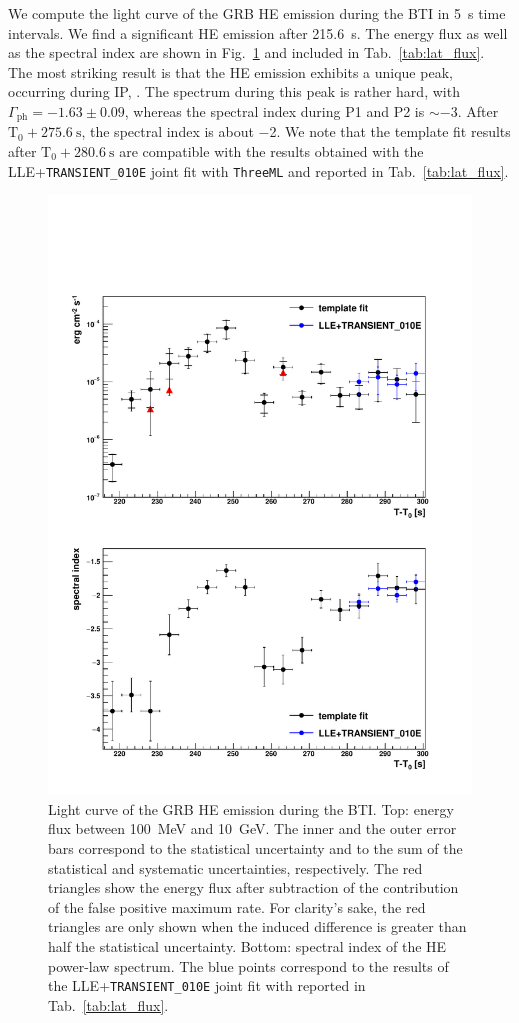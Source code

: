 \documentclass[preprint]{aastex631}
\begin{document}
We compute the light curve of the GRB HE emission during the BTI in 5~s time intervals. We find a significant HE emission after 215.6~s. The energy flux as well as the spectral index are shown in Fig.~\ref{fig:LightCurveBTI} and included in Tab.~\ref{tab:lat_flux}. The most striking result is that the HE emission exhibits a unique peak, occurring during IP, . The spectrum during this peak is rather hard, with $\Gamma_\mathrm{ph} = -1.63 \pm 0.09$, whereas the spectral index during P1 and P2 is $\sim -3$. After $\mathrm{T}_0+275.6~\mathrm{s}$, the spectral index is about $-$2. We note that the template fit results after $\mathrm{T}_0+280.6~\mathrm{s}$ are compatible with the results obtained with the LLE+{\tt TRANSIENT\_010E} joint fit with {\tt ThreeML} and reported in Tab.~\ref{tab:lat_flux}.

\begin{figure}[t]
    \centering
    \includegraphics[width=0.6\linewidth]{paper_showLightCurve_215.pdf}
    \caption{Light curve of the GRB HE emission during the BTI. Top: energy flux between 100~MeV and 10~GeV. The inner and the outer error bars correspond to the statistical uncertainty and to the sum of the statistical and systematic uncertainties, respectively. The red triangles show the energy flux after subtraction of the contribution of the false positive maximum rate. For clarity's sake, the red triangles are only shown when the induced difference is greater than half the statistical uncertainty. Bottom: spectral index of the HE power-law spectrum. The blue points correspond to the results of the LLE+{\tt TRANSIENT\_010E} joint fit with \ThreeML reported in Tab.~\ref{tab:lat_flux}.}
    \label{fig:LightCurveBTI}
\end{figure}
\end{document}
